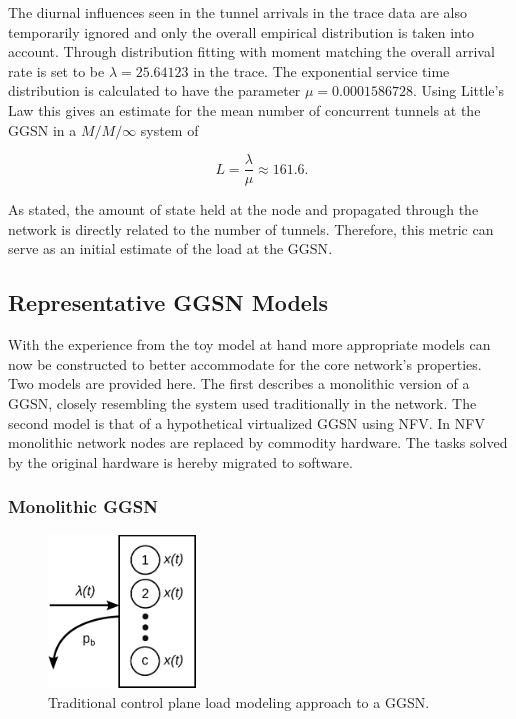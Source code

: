 The diurnal influences seen in the tunnel arrivals in the trace data are also temporarily ignored and only the overall empirical distribution is taken into account. Through distribution fitting with moment matching the overall arrival rate is set to be $\lambda=25.64123$ in the trace. The exponential service time distribution is calculated to have the parameter $\mu=0.0001586728$. Using Little's Law this gives an estimate for the mean number of concurrent tunnels at the \gls{GGSN} in a $M/M/\infty$ system of 

\begin{equation}
\phantom{.}L=\frac{\lambda}{\mu}\approx 161.6\text{.} %
\end{equation}

As stated, the amount of state held at the node and propagated through the network is directly related to the number of tunnels. Therefore, this metric can serve as an initial estimate of the load at the \gls{GGSN}.


\subsection{Representative GGSN Models} 

With the experience from the toy model at hand more appropriate models can now be constructed to better accommodate for the core network's properties. Two models are provided here.
The first describes a monolithic version of a \gls{GGSN}, closely resembling the system used traditionally in the network. The second model is that of a hypothetical virtualized \gls{GGSN} using \gls{NFV}. In \gls{NFV}~\cite{nfv_whitepaper} monolithic network nodes are replaced by commodity hardware. The tasks solved by the original hardware is hereby migrated to software.


\subsubsection{Monolithic \texorpdfstring{\acrshort{GGSN}}{GGSN}}

\begin{figure}[htb]
	\centering
	\includegraphics[width=0.35\textwidth]{images/ggsn-monolithic.pdf}
	\caption{Traditional control plane load modeling approach to a \gls{GGSN}.}
\label{c4:fig:model-ggsn-monolithic}
\end{figure}

